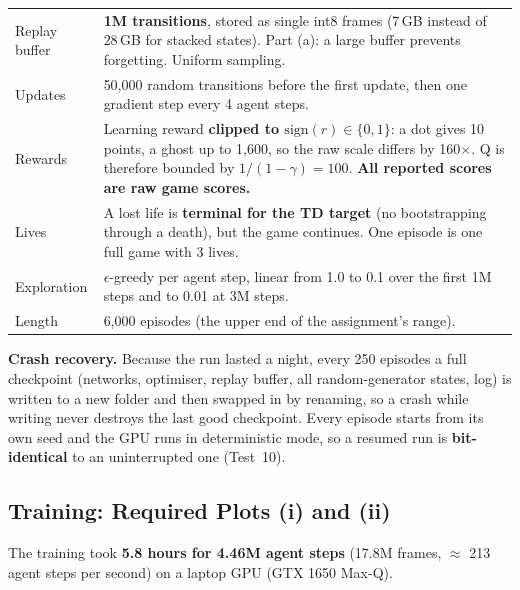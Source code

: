 \begin{center}
\begin{tabularx}{\textwidth}{@{}p{3.1cm}L@{}}
  Replay buffer & \textbf{1M transitions}, stored as single int8 frames (7\,GB instead of 28\,GB for stacked states). Part (a): a large buffer prevents forgetting. Uniform sampling. \\
  Updates & 50,000 random transitions before the first update, then one gradient step every 4 agent steps. \\
  Rewards & Learning reward \textbf{clipped to $\text{sign}(r) \in \{0, 1\}$}: a dot gives 10 points, a ghost up to 1,600, so the raw scale differs by 160$\times$. Q is therefore bounded by $1/(1-\gamma) = 100$. \textbf{All reported scores are raw game scores.} \\
  Lives & A lost life is \textbf{terminal for the TD target} (no bootstrapping through a death), but the game continues. One episode is one full game with 3 lives. \\
  Exploration & $\epsilon$-greedy per agent step, linear from 1.0 to 0.1 over the first 1M steps and to 0.01 at 3M steps. \\
  Length & 6,000 episodes (the upper end of the assignment's range). \\
  \bottomrule
\end{tabularx}
\end{center}


\textbf{Crash recovery.} Because the run lasted a night, every 250 episodes a full checkpoint (networks, optimiser, replay buffer, all random-generator states, log) is written to a new folder and then swapped in by renaming, so a crash while writing never destroys the last good checkpoint. Every episode starts from its own seed and the GPU runs in deterministic mode, so a resumed run is \textbf{bit-identical} to an uninterrupted one (Test~10).

\subsection{Training: Required Plots (i) and (ii)}

The training took \textbf{5.8 hours for 4.46M agent steps} (17.8M frames, $\approx$ 213 agent steps per second) on a laptop GPU (GTX 1650 Max-Q).


